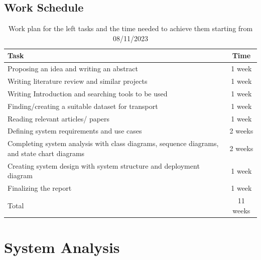 \documentclass[a4paper, 12pt]{article} %
\begin{document}
        \subsection{Work Schedule}
            \begin{table}[h]
               \caption{Work plan for the left tasks and the time needed to achieve them starting from 08/11/2023}
               \label{1stSemWorkPlanTable}
                \begin{center}
                    \begin{tabular}{m{10cm}|c}
                        \centering Task & Time \\ %
                        \hline
                        Proposing an idea and writing an abstract & 1 week \\
                        Writing literature review and similar projects & 1 week\\
                        Writing Introduction and searching tools to be used & 1 week \\
                        Finding/creating a suitable dataset for transport & 1 week \\
                        Reading relevant articles/ papers & 1 week \\
                        Defining system requirements and use cases & 2 weeks \\ 
                        Completing system analysis with class diagrams, sequence diagrams, and state chart diagrams  & 2 weeks \\
                        Creating system design with system structure and deployment diagram & 1 week \\
                        Finalizing the report & 1 week \\
                        \hline
                        \centering Total & 11 weeks \\
                    \end{tabular}
                \end{center}
            \end{table}
        
    \pagebreak
    \section{System Analysis}  
\end{document}
